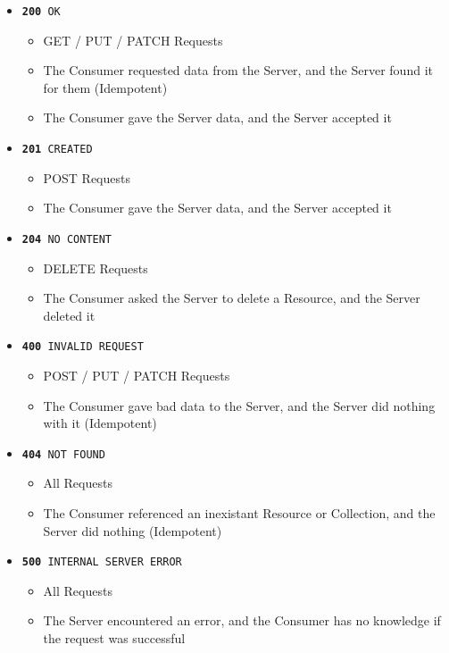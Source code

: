 \documentclass{book}
\begin{document}
\begin{itemize}
\item \texttt{\textbf{200} OK}
    \begin{itemize}
    \item GET / PUT / PATCH  Requests
    \item The Consumer requested data from the Server, and the Server found it for them (Idempotent)
    \item The Consumer gave the Server data, and the Server accepted it
    \end{itemize}
\item \texttt{\textbf{201} CREATED}
    \begin{itemize}
    \item POST Requests
    \item The Consumer gave the Server data, and the Server accepted it
    \end{itemize}
\item \texttt{\textbf{204} NO CONTENT}
    \begin{itemize}
    \item DELETE Requests
    \item The Consumer asked the Server to delete a Resource, and the Server deleted it
    \end{itemize}
\item \texttt{\textbf{400} INVALID REQUEST}
    \begin{itemize}
    \item POST / PUT / PATCH Requests
    \item The Consumer gave bad data to the Server, and the Server did nothing with it (Idempotent)
    \end{itemize}
\item \texttt{\textbf{404} NOT FOUND}
    \begin{itemize}
    \item All Requests
    \item The Consumer referenced an inexistant Resource or Collection, and the Server did nothing (Idempotent)
    \end{itemize}
\item \texttt{\textbf{500} INTERNAL SERVER ERROR}
    \begin{itemize}
    \item All Requests
    \item The Server encountered an error, and the Consumer has no knowledge if the request was successful
    \end{itemize}
\end{itemize}
\end{document}
